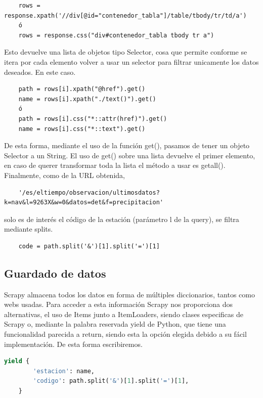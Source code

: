 \begin{verbatim}
	rows = response.xpath('//div[@id="contenedor_tabla"]/table/tbody/tr/td/a')
	ó
	rows = response.css("div#contenedor_tabla tbody tr a")
\end{verbatim}

Esto devuelve una lista de objetos tipo Selector, cosa que permite conforme se itera por cada elemento volver a usar un selector para filtrar unicamente los datos deseados. En este caso.

\begin{verbatim}
	path = rows[i].xpath("@href").get()
	name = rows[i].xpath("./text()").get()
	ó
	path = rows[i].css("*::attr(href)").get()
	name = rows[i].css("*::text").get()
\end{verbatim}

De esta forma, mediante el uso de la función get(), pasamos de tener un objeto Selector a un String. El uso de get() sobre una lista devuelve el primer elemento, en caso de querer transformar toda la lista el método a usar es getall().\newline
\newline
Finalmente, como de la URL obtenida,

\begin{verbatim}
	'/es/eltiempo/observacion/ultimosdatos?k=nav&l=9263X&w=0&datos=det&f=precipitacion'
\end{verbatim}

solo es de interés el código de la estación (parámetro l de la query), se filtra mediante splits.

\begin{verbatim}
	code = path.split('&')[1].split('=')[1]
\end{verbatim}

\subsection{Guardado de datos}
Scrapy almacena todos los datos en forma de múltiples diccionarios, tantos como webs usadas. Para acceder a esta información Scrapy nos proporciona dos alternativas, el uso de Items junto a ItemLoaders, siendo clases especificas de Scrapy o, mediante la palabra reservada yield de Python, que tiene una funcionalidad parecida a return, siendo esta la opción elegida debido a su fácil implementación.\newline
\newline
De esta forma escribiremos.

\begin{lstlisting}[language=Python, caption={Guardar datos}]
	yield {
		'estacion': name,
		'codigo': path.split('&')[1].split('=')[1],
	}
\end{lstlisting}

